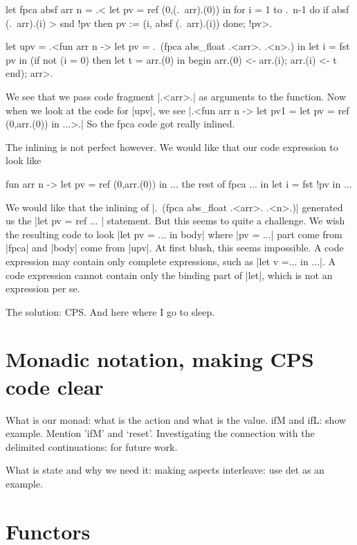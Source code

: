 \documentclass[11pt]{llncs}
\begin{document}
\begin{code}
let fpca absf arr n = .<
   let pv = ref (0,(.~arr).(0)) in
   for i = 1 to .~n-1 do
     if absf (.~arr).(i) > snd !pv then
        pv := (i, absf (.~arr).(i))
   done;
   !pv>.
\end{code}
\begin{code}
let upv = .<fun arr n ->
   let pv = .~(fpca abs_float .<arr>. .<n>.) in
   let i = fst pv in
   (if not (i = 0) then
      let t = arr.(0) in
      begin arr.(0) <- arr.(i); arr.(i) <- t end);
   arr>.
\end{code}
We see that we pass code fragment |.<arr>.| as arguments to the
function. Now when we look at the code for |upv|, we see
|.<fun arr n -> let pv1 = let pv = ref (0,arr.(0)) in ...>.|
So the fpca code got really inlined.

The inlining is not perfect however. We would like that our code
expression to look like
\begin{code}
 fun arr n ->
   let pv = ref (0,arr.(0)) in ... the rest of fpca ...
   in let i = fst !pv in ...
\end{code}

We would like that the inlining of |.~(fpca abs_float .<arr>. .<n>.)|
generated us the |let pv = ref ... | statement. But this seems to
quite a challenge. We wish the resulting code to look
|let pv = ... in body| where |pv = ...| part come from |fpca| and
|body| come from |upv|. At first blush, this seems impossible. A code
expression may contain only complete expressions, such as
|let v =... in ...|. A code expression cannot contain only the binding part of
|let|, which is not an expression per se.

The solution: CPS. And here where I go to sleep.



\section{Monadic notation, making CPS code clear}

What is our monad: what is the action and what is the value.
ifM and ifL: show example. Mention 'ifM' and `reset'. Investigating
the connection with the delimited continuations: for future work.

What is state and why we need it: making aspects interleave: use det
as an example.

\section{Functors}
\end{document}
